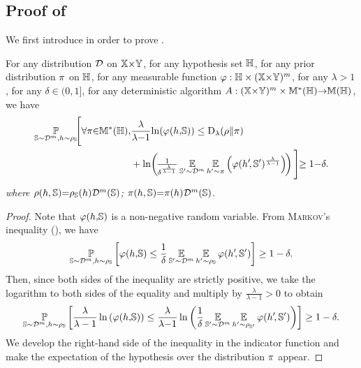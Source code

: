 \begin{noaddcontents}
\section{Proof of }
\label{ap:dis-pra:sec:proof-mutual-info}

We first introduce  in order to prove .
\begin{lemma} For any distribution $\D$ on $\X{\times}\Y$, for any hypothesis set $\H$, for any prior distribution $\P$ on $\H$, for any  measurable function $\varphi:\H\times (\X{\times}\Y)^{\m}$, for any $\lambda>1$, for any $\delta\in(0,1]$, for any deterministic algorithm $A:(\X{\times}\Y)^{\m}\times\M^{*}(\H){\rightarrow} \M(\H)$, we have
\begin{align*}
    \PP_{\S\sim\D^{\m}, \h\sim \AQ}\!\!\Bigg[\forall\P{\in}\M^{*}(\H),& \displaystyle\frac{\lambda}{\lambda{-}1}\!\ln\!\LP\varphi(\h,\!\S)\RP \le \Renyi_{\lambda}(\rho\|\pi)\\
    &+\ln\!\LP\!\tfrac{1}{\delta^{\frac{\lambda}{\lambda{-}1}}}\EE_{\S'{\sim}\D^{\m}}\EE_{\h'{\sim} \P}\LP\varphi(\h'\!, \S')^{\frac{\lambda}{\lambda-1}}\RP\!\RP \Bigg]\!\!\ge 1{-}\delta.
\end{align*}
\textit{where $\rho(\h, \S){=} \AQ(\h)\D^{\m}(\S)$; $\pi(\h, \S){=} \P(\h)\D^{\m}(\S)$.}
\label{chap:dis-pra:lemma:mutual-info}
\end{lemma}
\begin{proof}
Note that $\varphi(\h,\!\S)$ is a non-negative random variable. 
From \textsc{Markov}'s inequality (), we have
\begin{align*}
    \PP_{\S\sim\D^{\m}, \h\sim \AQ}\LB \varphi(\h,\!\S)\le \frac{1}{\delta}\EE_{\S'{\sim}\D^{\m}}\EE_{\h'{\sim} \AQ}\varphi(\h'\!, \S') \RB \ge 1-\delta.
\end{align*}
Then, since both sides of the inequality are strictly positive, we take the logarithm to both sides of the equality and multiply by $\frac{\lambda}{\lambda-1}>0$ to obtain
\begin{align*}
\PP_{\S\sim\D^{\m},\h\sim \AQ}\LB\frac{\lambda}{\lambda-1}\ln\LP\varphi(\h,\!\S)\RP \le \frac{\lambda}{\lambda{-}1}\ln\LP\frac{1}{\delta}\EE_{\S'{\sim}\D^{\m}}\EE_{\h'{\sim} \AQp }\varphi(\h'\!, \S')\RP\RB\ge 1-\delta.
\end{align*}
We develop the right-hand side of the inequality in the indicator function and make the expectation of the hypothesis over the distribution $\P$ appear.

\end{proof}
\end{noaddcontents}
